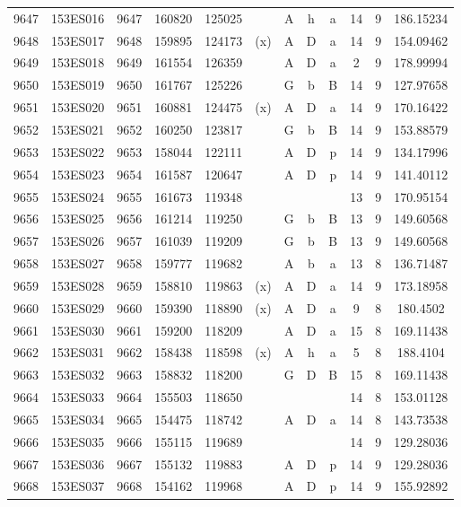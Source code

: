 \begin{tabular}{|*{12}{c|}}
9647 & 153ES016 & 9647 & 160820 & 125025 &  & A & h & a & 14 & 9 & 186.15234 \\ 
9648 & 153ES017 & 9648 & 159895 & 124173 & (x) & A & D & a & 14 & 9 & 154.09462 \\ 
9649 & 153ES018 & 9649 & 161554 & 126359 &  & A & D & a & 2 & 9 & 178.99994 \\ 
9650 & 153ES019 & 9650 & 161767 & 125226 &  & G & b & B & 14 & 9 & 127.97658 \\ 
9651 & 153ES020 & 9651 & 160881 & 124475 & (x) & A & D & a & 14 & 9 & 170.16422 \\ 
9652 & 153ES021 & 9652 & 160250 & 123817 &  & G & b & B & 14 & 9 & 153.88579 \\ 
9653 & 153ES022 & 9653 & 158044 & 122111 &  & A & D & p & 14 & 9 & 134.17996 \\ 
9654 & 153ES023 & 9654 & 161587 & 120647 &  & A & D & p & 14 & 9 & 141.40112 \\ 
9655 & 153ES024 & 9655 & 161673 & 119348 &  &  &  &  & 13 & 9 & 170.95154 \\ 
9656 & 153ES025 & 9656 & 161214 & 119250 &  & G & b & B & 13 & 9 & 149.60568 \\ 
9657 & 153ES026 & 9657 & 161039 & 119209 &  & G & b & B & 13 & 9 & 149.60568 \\ 
9658 & 153ES027 & 9658 & 159777 & 119682 &  & A & b & a & 13 & 8 & 136.71487 \\ 
9659 & 153ES028 & 9659 & 158810 & 119863 & (x) & A & D & a & 14 & 9 & 173.18958 \\ 
9660 & 153ES029 & 9660 & 159390 & 118890 & (x) & A & D & a & 9 & 8 & 180.4502 \\ 
9661 & 153ES030 & 9661 & 159200 & 118209 &  & A & D & a & 15 & 8 & 169.11438 \\ 
9662 & 153ES031 & 9662 & 158438 & 118598 & (x) & A & h & a & 5 & 8 & 188.4104 \\ 
9663 & 153ES032 & 9663 & 158832 & 118200 &  & G & D & B & 15 & 8 & 169.11438 \\ 
9664 & 153ES033 & 9664 & 155503 & 118650 &  &  &  &  & 14 & 8 & 153.01128 \\ 
9665 & 153ES034 & 9665 & 154475 & 118742 &  & A & D & a & 14 & 8 & 143.73538 \\ 
9666 & 153ES035 & 9666 & 155115 & 119689 &  &  &  &  & 14 & 9 & 129.28036 \\ 
9667 & 153ES036 & 9667 & 155132 & 119883 &  & A & D & p & 14 & 9 & 129.28036 \\ 
9668 & 153ES037 & 9668 & 154162 & 119968 &  & A & D & p & 14 & 9 & 155.92892 \\ 

\end{tabular}
